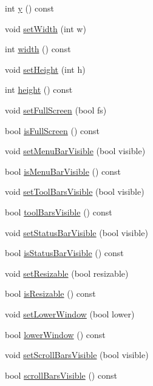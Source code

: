 \begin{DoxyCompactItemize}
\item 
int \hyperlink{classKParts_1_1WindowArgs_a3fcb463bb6b6e87fd9cd9fdd55ecd30b}{y} () const 
\item 
void \hyperlink{classKParts_1_1WindowArgs_a4af288c9b6ace9560aa5fc1e5af39de3}{set\-Width} (int w)
\item 
int \hyperlink{classKParts_1_1WindowArgs_a2e71e88878e5ed699cdc591715eee509}{width} () const 
\item 
void \hyperlink{classKParts_1_1WindowArgs_a85a07a9fafa90d79edfd338ad2a9dae5}{set\-Height} (int h)
\item 
int \hyperlink{classKParts_1_1WindowArgs_abc7756c372df99be8d83bc6e1574734a}{height} () const 
\item 
void \hyperlink{classKParts_1_1WindowArgs_a9779524444f507933ea314f5e31c893e}{set\-Full\-Screen} (bool fs)
\item 
bool \hyperlink{classKParts_1_1WindowArgs_a5bd1ed448fedb091f633c82104abdf97}{is\-Full\-Screen} () const 
\item 
void \hyperlink{classKParts_1_1WindowArgs_a8ea1f1f5a6fbc6f8db6b1564fb36926c}{set\-Menu\-Bar\-Visible} (bool visible)
\item 
bool \hyperlink{classKParts_1_1WindowArgs_abf3d15dc8f4267d1e3ad8e2bcb846283}{is\-Menu\-Bar\-Visible} () const 
\item 
void \hyperlink{classKParts_1_1WindowArgs_a14a892eb0edb68e49056e751bebf6425}{set\-Tool\-Bars\-Visible} (bool visible)
\item 
bool \hyperlink{classKParts_1_1WindowArgs_ac87b860b3157db4f6c5d1d512b3cfb8c}{tool\-Bars\-Visible} () const 
\item 
void \hyperlink{classKParts_1_1WindowArgs_acde0aa5cbc892404c4c3a8bfd9829eba}{set\-Status\-Bar\-Visible} (bool visible)
\item 
bool \hyperlink{classKParts_1_1WindowArgs_af2932404a1a223126e60e31737c62e11}{is\-Status\-Bar\-Visible} () const 
\item 
void \hyperlink{classKParts_1_1WindowArgs_a238f7aa7f8aebea2180d7b7cafa961c4}{set\-Resizable} (bool resizable)
\item 
bool \hyperlink{classKParts_1_1WindowArgs_a8031d2745585e35410e834ed5e7f1265}{is\-Resizable} () const 
\item 
void \hyperlink{classKParts_1_1WindowArgs_adebf8b4fb811f068cba27e6e2a050f0b}{set\-Lower\-Window} (bool lower)
\item 
bool \hyperlink{classKParts_1_1WindowArgs_a437e2bf77cfcd30b1d98b6160a4f4f2d}{lower\-Window} () const 
\item 
void \hyperlink{classKParts_1_1WindowArgs_a3f861f5f5ed4719e9c3d4ee8a688d18a}{set\-Scroll\-Bars\-Visible} (bool visible)
\item 
bool \hyperlink{classKParts_1_1WindowArgs_a9eb6ebe54b896f33f84d1379c71be18a}{scroll\-Bars\-Visible} () const 
\end{DoxyCompactItemize}


